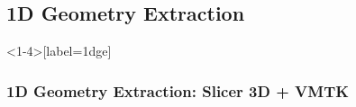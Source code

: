 \documentclass[compress]{beamer}
\begin{document}
\subsection{1D Geometry Extraction}
\begin{frame}<1-4>[label=1dge]
	\frametitle{1D Geometry Extraction: Slicer 3D + VMTK}
	\begin{minipage}{\linewidth}
\end{minipage}
\end{frame}
\end{document}

